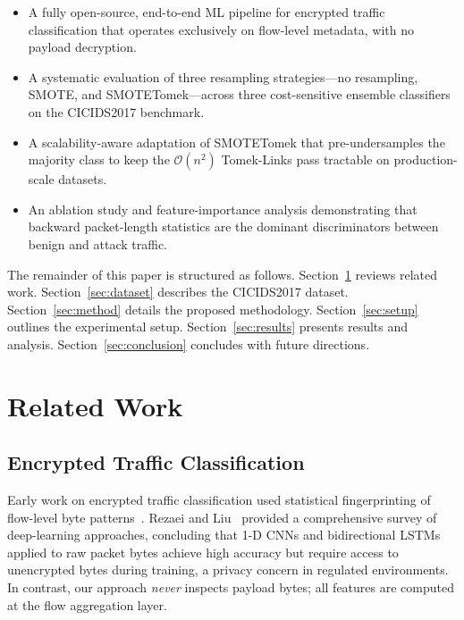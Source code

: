\documentclass[conference]{IEEEtran}
\begin{document}
\begin{itemize}
\item A fully open-source, end-to-end ML pipeline for encrypted traffic
      classification that operates exclusively on flow-level metadata,
      with no payload decryption.
\item A systematic evaluation of three resampling strategies—no
      resampling, SMOTE, and SMOTETomek—across three cost-sensitive
      ensemble classifiers on the CICIDS2017 benchmark.
\item A scalability-aware adaptation of SMOTETomek that pre-undersamples
      the majority class to keep the $\mathcal{O}(n^2)$ Tomek-Links
      pass tractable on production-scale datasets.
\item An ablation study and feature-importance analysis demonstrating
      that backward packet-length statistics are the dominant
      discriminators between benign and attack traffic.
\end{itemize}

The remainder of this paper is structured as follows. Section~\ref{sec:related}
reviews related work.  Section~\ref{sec:dataset} describes the CICIDS2017
dataset.  Section~\ref{sec:method} details the proposed methodology.
Section~\ref{sec:setup} outlines the experimental setup.
Section~\ref{sec:results} presents results and analysis.
Section~\ref{sec:conclusion} concludes with future directions.

\section{Related Work}
\label{sec:related}

\subsection{Encrypted Traffic Classification}

Early work on encrypted traffic classification used statistical fingerprinting
of flow-level byte patterns~\cite{lotfollahi2020}.  Rezaei and
Liu~\cite{rezaei2019} provided a comprehensive survey of deep-learning
approaches, concluding that 1-D CNNs and bidirectional LSTMs applied
to raw packet bytes achieve high accuracy but require access to
unencrypted bytes during training, a privacy concern in regulated
environments.  In contrast, our approach \textit{never} inspects payload
bytes; all features are computed at the flow aggregation layer.
\end{document}
